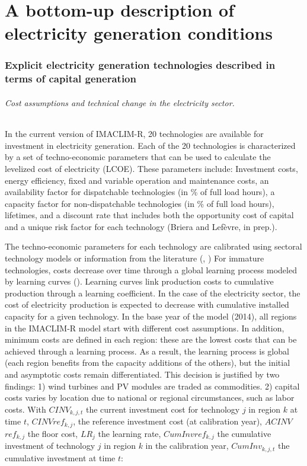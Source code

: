 \part*{A bottom-up description of electricity generation conditions}

\section{Explicit electricity generation technologies described in terms of capital generation}

\paragraph {Cost assumptions and technical change in the electricity sector.} In the current version of IMACLIM-R, 20 technologies are available for investment in electricity generation. Each of the 20 technologies is characterized by a set of techno-economic parameters that can be used to calculate the levelized cost of electricity (LCOE). These parameters include: Investment costs, energy efficiency, fixed and variable operation and maintenance costs, an availability factor for dispatchable technologies (in \% of full load hours), a capacity factor for non-dispatchable technologies (in \% of full load hours), lifetimes, and a discount rate that includes both the opportunity cost of capital and a unique risk factor for each technology (Briera and Lefèvre, in prep.).

The techno-economic parameters for each technology are calibrated using sectoral technology models or information from the literature (\cite{IEA2020}, \cite{IRENA2020})
For immature technologies, costs decrease over time through a global learning process modeled by learning curves (\cite{Neij2008}). Learning curves link production costs to cumulative production through a learning coefficient. In the case of the electricity sector, the cost of electricity production is expected to decrease with cumulative installed capacity for a given technology. In the base year of the model (2014), all regions in the IMACLIM-R model start with different cost assumptions. In addition, minimum costs are defined in each region: these are the lowest costs that can be achieved through a learning process. As a result, the learning process is global (each region benefits from the capacity additions of the others), but the initial and asymptotic costs remain differentiated. This decision is justified by two findings: 1) wind turbines and PV modules are traded as commodities. 2) capital costs varies by location due to national or regional circumstances, such as labor costs. With $CINV_{k,j,t}$ the current investment cost for technology $j$ in region $k$ at time $t$, $CINV$\textunderscore $ref_{k,j}$, the reference investment cost (at calibration year), $A$\textunderscore$CINV$\textunderscore$ref_{k,j}$ the floor cost, $LR_{j}$ the learning rate, $Cum$\textunderscore$Inv$\textunderscore$ref_{k,j}$ the cumulative investment of technology $j$ in region $k$ in the calibration year, $Cum$\textunderscore $Inv_{k,j,t}$ the cumulative investment at time $t$:


